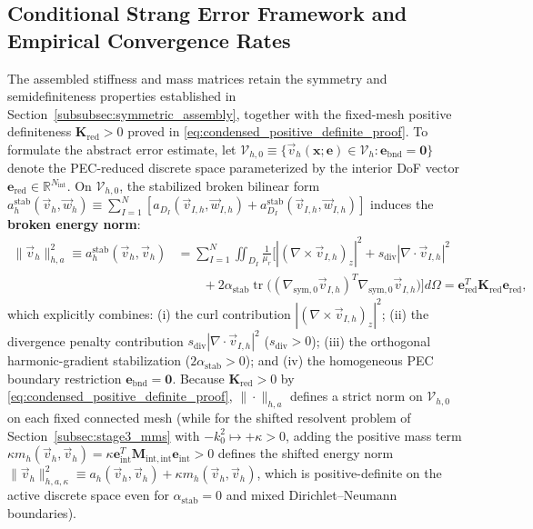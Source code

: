 \documentclass[VANCOUVER,Times1COL]{WileyNJD-v5}
\begin{document}
\subsection{Conditional Strang Error Framework and Empirical Convergence Rates}
\label{subsubsec:strang_framework}

The assembled stiffness and mass matrices retain the symmetry and semidefiniteness properties established in Section~\ref{subsubsec:symmetric_assembly}, together with the fixed-mesh positive definiteness $\mathbf{K}_{\mathrm{red}} > 0$ proved in \eqref{eq:condensed_positive_definite_proof}. To formulate the abstract error estimate, let $\mathcal{V}_{h,0} \equiv \{ \vec{v}_h(\mathbf{x}; \mathbf{e}) \in \mathcal{V}_h : \mathbf{e}_{\mathrm{bnd}} = \mathbf{0} \}$ denote the PEC-reduced discrete space parameterized by the interior DoF vector $\mathbf{e}_{\mathrm{red}} \in \mathbb{R}^{N_{\mathrm{int}}}$. On $\mathcal{V}_{h,0}$, the stabilized broken bilinear form $a_h^{\mathrm{stab}}(\vec{v}_h, \vec{w}_h) \equiv \sum_{I=1}^N [a_{D_I}(\vec{v}_{I,h}, \vec{w}_{I,h}) + a_{D_I}^{\mathrm{stab}}(\vec{v}_{I,h}, \vec{w}_{I,h})]$ induces the \textbf{broken energy norm}:
\begin{equation}
    \begin{aligned}
        \|\vec{v}_h\|_{h, a}^2 \equiv a_h^{\mathrm{stab}}(\vec{v}_h, \vec{v}_h) & = \sum_{I=1}^N \iint_{D_I} \frac{1}{\mu_r} \Big[ |(\nabla \times \vec{v}_{I,h})_z|^2 + s_{\mathrm{div}} |\nabla \cdot \vec{v}_{I,h}|^2 \\
                                                                                & \qquad + 2\alpha_{\mathrm{stab}} \operatorname{tr}\!\big((\nabla_{\mathrm{sym},0}\vec{v}_{I,h})^T \nabla_{\mathrm{sym},0}\vec{v}_{I,h}\big) \Big] d\Omega = \mathbf{e}_{\mathrm{red}}^T \mathbf{K}_{\mathrm{red}} \mathbf{e}_{\mathrm{red}},
    \end{aligned}
    \label{eq:broken_energy_norm_def}
\end{equation}
which explicitly combines: (i) the curl contribution $|(\nabla \times \vec{v}_{I,h})_z|^2$; (ii) the divergence penalty contribution $s_{\mathrm{div}}|\nabla \cdot \vec{v}_{I,h}|^2$ ($s_{\mathrm{div}} > 0$); (iii) the orthogonal harmonic-gradient stabilization ($2\alpha_{\mathrm{stab}} > 0$); and (iv) the homogeneous PEC boundary restriction $\mathbf{e}_{\mathrm{bnd}} = \mathbf{0}$. Because $\mathbf{K}_{\mathrm{red}} > 0$ by \eqref{eq:condensed_positive_definite_proof}, $\|\cdot\|_{h,a}$ defines a strict norm on $\mathcal{V}_{h,0}$ on each fixed connected mesh (while for the shifted resolvent problem of Section~\ref{subsec:stage3_mms} with $-k_0^2 \mapsto +\kappa > 0$, adding the positive mass term $\kappa m_h(\vec{v}_h, \vec{v}_h) = \kappa \mathbf{e}_{\mathrm{int}}^T \mathbf{M}_{\mathrm{int},\mathrm{int}} \mathbf{e}_{\mathrm{int}} > 0$ defines the shifted energy norm $\|\vec{v}_h\|_{h,a,\kappa}^2 \equiv a_h(\vec{v}_h, \vec{v}_h) + \kappa m_h(\vec{v}_h, \vec{v}_h)$, which is positive-definite on the active discrete space even for $\alpha_{\mathrm{stab}} = 0$ and mixed Dirichlet--Neumann boundaries).
\end{document}
